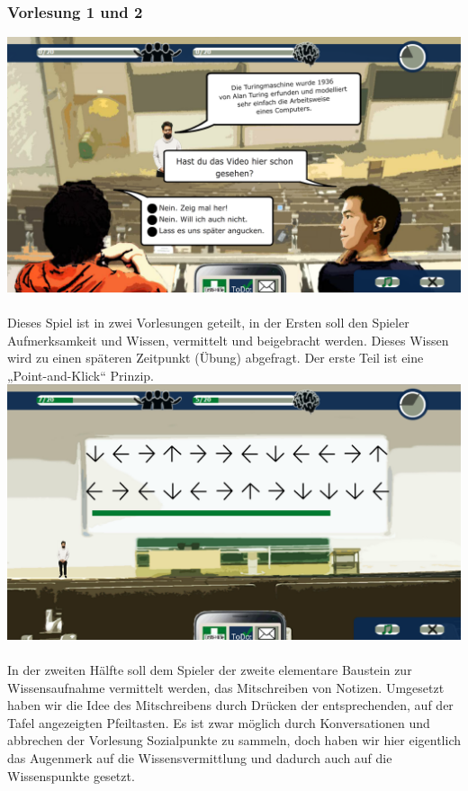 \documentclass[a4paper, 11pt]{article} %
\begin{document}
\subsubsection{Vorlesung 1 und 2}
\includegraphics[scale=0.46]{images/spiel/vorlesung1.png}\\\\
Dieses Spiel ist in zwei Vorlesungen geteilt, in der Ersten soll den Spieler Aufmerksamkeit und Wissen, vermittelt und beigebracht werden. Dieses Wissen wird zu einen späteren Zeitpunkt (Übung) abgefragt. Der erste Teil ist eine „Point-and-Klick“ Prinzip. \\
\includegraphics[scale=0.46]{images/spiel/vorlesung2.png}\\\\
In der zweiten Hälfte soll dem Spieler der zweite elementare Baustein zur Wissensaufnahme vermittelt werden, das Mitschreiben von Notizen. Umgesetzt haben wir die Idee des Mitschreibens durch Drücken der entsprechenden, auf der Tafel angezeigten Pfeiltasten. Es ist zwar möglich durch Konversationen und abbrechen der Vorlesung Sozialpunkte zu sammeln, doch haben wir hier eigentlich das Augenmerk auf die Wissensvermittlung und dadurch auch auf die Wissenspunkte gesetzt.
\end{document}
